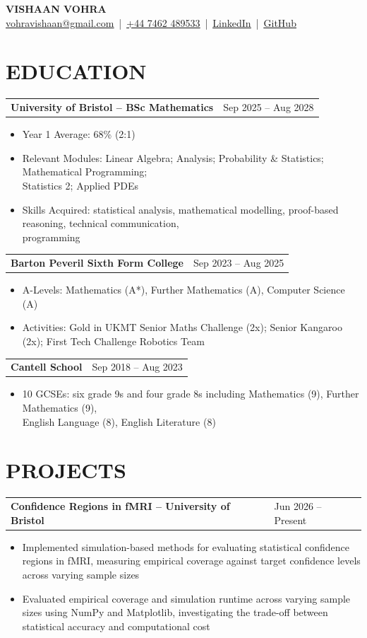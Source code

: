 \documentclass[9.5pt,a4paper]{article}
\makeatletter
\newcommand{\entry}[2]{%
  \vspace{2.5pt}%
  \begin{tabularx}{\textwidth}{@{}X>{\raggedleft\arraybackslash}p{3.45cm}@{}}
    \textbf{#1} & #2
  \end{tabularx}
}
\newcommand{\bulletitem}[1]{
  \item #1
}
\makeatother
\begin{document}
\begin{center}
    {\fontsize{17}{20}\selectfont\textbf{VISHAAN VOHRA}}\\[3pt]
    {\normalsize
    \href{mailto:vohravishaan@gmail.com}{\underline{vohravishaan@gmail.com}}
    \,|\, \href{tel:+447462489533}{\underline{+44 7462 489533}}
    \,|\, \href{https://www.linkedin.com/in/vishaanvohra}{\underline{LinkedIn}}
    \,|\, \href{https://github.com/vishaanvohra}{\underline{GitHub}}
    }
\end{center}

\section*{EDUCATION}

\entry{University of Bristol -- BSc Mathematics}{Sep 2025 -- Aug 2028}
\begin{itemize}
    \bulletitem{Year 1 Average: 68\% (2:1)}
    \bulletitem{Relevant Modules: Linear Algebra; Analysis; Probability \& Statistics; Mathematical Programming;\\
    Statistics 2; Applied PDEs}
    \bulletitem{Skills Acquired: statistical analysis, mathematical modelling, proof-based reasoning, technical communication, \\ programming
    }
\end{itemize}

\entry{Barton Peveril Sixth Form College}{Sep 2023 -- Aug 2025}
\begin{itemize}
    \bulletitem{A-Levels: Mathematics (A*), Further Mathematics (A), Computer Science (A)}
    \bulletitem{Activities: Gold in UKMT Senior Maths Challenge (2x); Senior Kangaroo (2x); First Tech Challenge Robotics Team}
\end{itemize}

\entry{Cantell School}{Sep 2018 -- Aug 2023}
\begin{itemize}
    \bulletitem{10 GCSEs: six grade 9s and four grade 8s including Mathematics (9), Further Mathematics (9),\\
    English Language (8), English Literature (8)}
\end{itemize}

\section*{PROJECTS}

\entry{Confidence Regions in fMRI -- University of Bristol}{Jun 2026 -- Present}
\begin{itemize}
    \bulletitem{Implemented simulation-based methods for evaluating statistical confidence regions in fMRI, measuring empirical coverage against target confidence levels across varying sample sizes}
    \bulletitem{Evaluated empirical coverage and simulation runtime across varying sample sizes using NumPy and Matplotlib, investigating the trade-off between statistical accuracy and computational cost}
\end{itemize}
\end{document}
